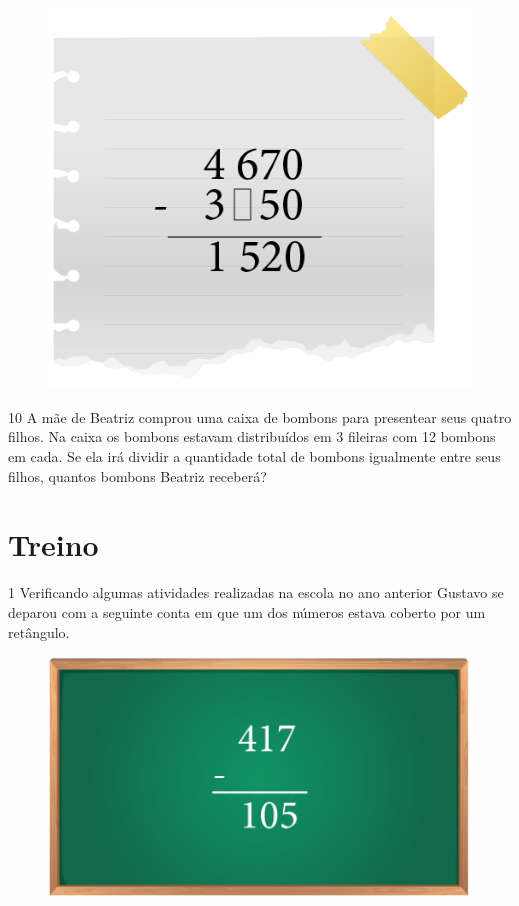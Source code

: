 \begin{figure}[htpb!]
\centering
\includegraphics[width=.4\textwidth]{../ilustracoes/MAT5/SAEB_5ANO_MAT_figura21.png}
\end{figure}


\bigskip
\bigskip
\bigskip
\bigskip

\num{10} A mãe de Beatriz comprou uma caixa de bombons para presentear seus
quatro filhos. Na caixa os bombons estavam distribuídos em 3 fileiras
com 12 bombons em cada. Se ela irá dividir a quantidade total de bombons
igualmente entre seus filhos, quantos bombons Beatriz receberá?

\begin{mdframed}[linewidth=2pt,linecolor=salmao]
\mbox{}\vspace*{6cm}
\end{mdframed}

\pagebreak

\section{Treino}

\num{1} Verificando algumas atividades realizadas na escola no ano anterior
Gustavo se deparou com a seguinte conta em que um dos números estava
coberto por um retângulo.

\begin{figure}[htpb!]
\centering
\includegraphics[width=.5\textwidth]{../ilustracoes/MAT5/SAEB_5ANO_MAT_figura22.png}
\end{figure}


